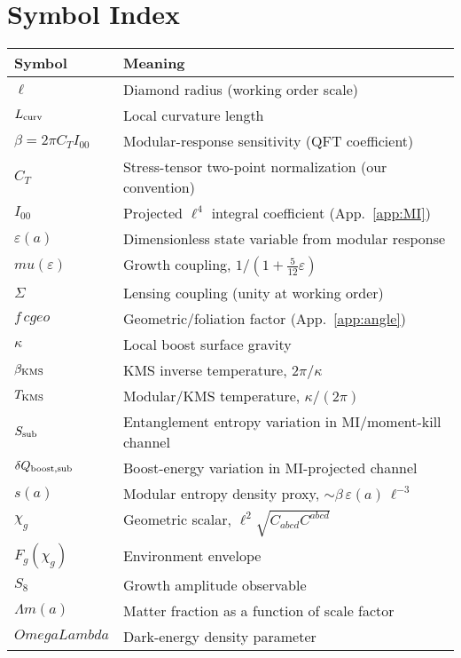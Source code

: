 \documentclass[aps,prd,onecolumn,superscriptaddress,nofootinbib]{revtex4-2}
\def\OmL{OmegaLambda}%
\def\cgeo{cgeo}%
\def\mu{mu}%
\def\Omega_\Lambda{OmegaLambda}%
\providecommand{\OmL}{\Omega_\Lambda}
\providecommand{\cgeo}{c_{\rm geo}}
\begin{document}
\section*{Symbol Index}
\begin{tabular}{@{}ll@{}}
\toprule
Symbol & Meaning \\
\midrule
\(\ell\) & Diamond radius (working order scale) \\
\(L_{\rm curv}\) & Local curvature length \\
\(\beta=2\pi C_T I_{00}\) & Modular-response sensitivity (QFT coefficient) \\
\(C_T\) & Stress-tensor two-point normalization (our convention) \\
\(I_{00}\) & Projected \(\ell^4\) integral coefficient (App.~\ref{app:MI}) \\
\(\varepsilon(a)\) & Dimensionless state variable from modular response \\
\(\mu(\varepsilon)\) & Growth coupling, \(1/(1+\tfrac{5}{12}\varepsilon)\) \\
\(\Sigma\) & Lensing coupling (unity at working order) \\
\(f\,\cgeo\) & Geometric/foliation factor (App.~\ref{app:angle}) \\
\(\kappa\) & Local boost surface gravity \\
\(\beta_{\rm KMS}\) & KMS inverse temperature, \(2\pi/\kappa\) \\
\(T_{\rm KMS}\) & Modular/KMS temperature, \(\kappa/(2\pi)\) \\
\(S_{\rm sub}\) & Entanglement entropy variation in MI/moment-kill channel \\
\(\delta Q_{\rm boost,sub}\) & Boost-energy variation in MI-projected channel \\
\(s(a)\) & Modular entropy density proxy, \(\sim \beta\,\varepsilon(a)\,\ell^{-3}\) \\
\(\chi_g\) & Geometric scalar, \(\ell^2\sqrt{C_{abcd}C^{abcd}}\) \\
\(F_g(\chi_g)\) & Environment envelope \\
\(S_8\) & Growth amplitude observable \\
\(\Omega_m(a)\) & Matter fraction as a function of scale factor \\
\(\OmL\) & Dark-energy density parameter \\
\bottomrule
\end{tabular}
\end{document}
